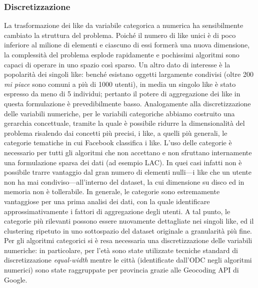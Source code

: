 \subsubsection{Discretizzazione}
\label{subsubsec:discretizzazione}
La trasformazione dei like da variabile categorica a numerica ha sensibilmente cambiato la struttura del problema. Poich\'e il numero di like unici \`e di poco inferiore al milione di elementi e ciascuno di essi former\`a una nuova dimensione, la complessit\`a del problema esplode rapidamente e pochissimi algoritmi sono capaci di operare in uno spazio cos\`i sparso. Un altro dato di interesse \`e la popolarit\`a dei singoli like: bench\'e esistano oggetti largamente condivisi (oltre 200 \textit{mi piace} sono comuni a pi\`u di 1000 utenti), in media un singolo like \`e stato espresso da meno di 5 individui; pertanto il potere di aggregazione dei like in questa formulazione \`e prevedibilmente basso. Analogamente alla discretizzazione delle variabili numeriche, per le variabili categoriche abbiamo costruito una gerarchia concettuale, tramite la quale \`e possibile ridurre la dimensionalit\`a del problema risalendo dai concetti pi\`u precisi, i like, a quelli pi\`u generali, le categorie tematiche in cui Facebook classifica i like. L'uso delle categorie \`e necessario per tutti gli algoritmi che non accettano e non sfruttano internamente una formulazione sparsa dei dati (ad esempio LAC). In quei casi infatti non \`e possibile trarre vantaggio dal gran numero di elementi nulli---i like che un utente non ha mai condiviso---all'interno del dataset, la cui dimensione su disco ed in memoria non \`e tollerabile. In generale, le categorie sono estremamente vantaggiose per una prima analisi dei dati, con la quale identificare approssimativamente i fattori di aggregazione degli utenti. A tal punto, le categorie pi\`u rilevanti possono essere nuovamente dettagliate nei singoli like, ed il clustering ripetuto in uno sottospazio del dataset originale a granularit\`a pi\`u fine.\\
Per gli algoritmi categorici si \`e resa necessaria una discretizzazione delle variabili numeriche: in particolare, per l'et\`a sono state utilizzate tecniche standard di discretizzazione \textit{equal-width} mentre le citt\`a (identificate dall'ODC negli algoritmi numerici) sono state raggruppate per provincia grazie alle Geocoding API di Google.
